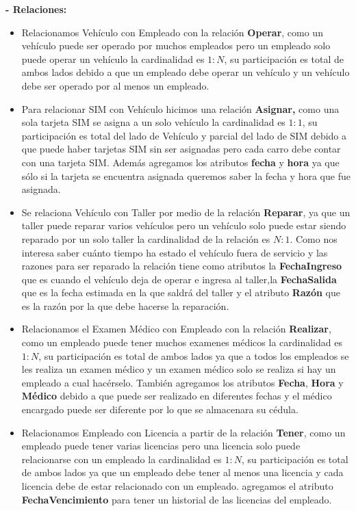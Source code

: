 \documentclass[letterpaper,11pt]{article}
\begin{document}
      \textbf{- Relaciones: }

      \begin{itemize}
      \item Relacionamos Vehículo con Empleado con la relación
            \textbf{Operar}, como un vehículo puede ser operado por muchos
            empleados pero un empleado solo puede operar un vehículo
            la cardinalidad es $1:N$, su participación es total de ambos
            lados debido a que un empleado debe operar un vehículo y un
            vehículo debe ser operado por al menos un empleado.
      \item Para relacionar SIM con Vehículo hicimos
            una relación \textbf{Asignar,} como una sola tarjeta SIM
            se asigna a un solo vehículo la cardinalidad es $1:1$, su
            participación es total del lado de Vehículo y
            parcial del lado de SIM debido a que puede haber tarjetas SIM
            sin ser asignadas pero cada carro debe contar con una tarjeta
            SIM. Además agregamos los atributos \textbf{fecha} y \textbf{hora}
            ya que sólo si la tarjeta se encuentra asignada queremos saber
            la fecha y hora que fue asignada.
      \item Se relaciona Vehículo con Taller por medio de la relación \textbf{Reparar},  ya que un taller puede reparar varios vehículos pero un vehículo solo puede estar siendo reparado por un solo taller la cardinalidad de la relación es $N:1$. Como nos interesa saber cuánto tiempo ha estado el vehículo fuera de servicio y las razones  para ser reparado la relación tiene como atributos la \textbf{FechaIngreso} que es cuando el vehículo deja de operar e ingresa al taller,la \textbf{FechaSalida} que es la fecha estimada en la que saldrá del taller y el atributo \textbf{Razón} que es la razón por la que debe hacerse la reparación.
      \item Relacionamos el Examen Médico con Empleado con la relación
            \textbf{Realizar}, como un empleado puede tener muchos
            examenes médicos la cardinalidad es $1:N$, su participación
            es total de ambos lados ya que a todos los empleados se les
            realiza un examen médico y un examen médico solo se realiza
            si hay un empleado a cual hacérselo. También agregamos los
            atributos \textbf{Fecha}, \textbf{Hora} y \textbf{Médico}
            debido a que puede ser realizado en diferentes fechas y el médico
            encargado puede ser diferente por lo que se almacenara su cédula.
      \item Relacionamos Empleado con Licencia a partir de la relación
            \textbf{Tener}, como un empleado puede tener varias licencias
            pero una licencia solo puede relacionarse con un empleado
            la cardinalidad es $1:N$, su participación es total de
            ambos lados ya que un empleado debe tener al menos una licencia
            y cada licencia debe de estar relacionado con un empleado. agregamos
            el atributo \textbf{FechaVencimiento} para tener un historial de
            las licencias del empleado.
      \end{itemize}
\end{document}
